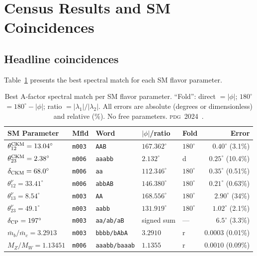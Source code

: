 \documentclass[preprint,12pt,number]{elsarticle}
\newcommand{\mfld}[1]{\texttt{#1}}
\newcommand{\word}[1]{\texttt{#1}}
\newcommand{\degr}{^{\circ}}
\newcommand{\PDG}{\textsc{pdg}}
\begin{document}
\section{Census Results and SM Coincidences}
\label{sec:results}

\subsection{Headline coincidences}
\label{sec:headline}

Table~\ref{tab:headline} presents the best spectral match for each SM flavor
parameter.

\begin{table}[htbp]
\centering
\caption{Best A-factor spectral match per SM flavor parameter.
  ``Fold'': direct $=|\phi|$; $180\degr$$=180\degr-|\phi|$; ratio $=|\lambda_1|/|\lambda_2|$.
  All errors are absolute (degrees or dimensionless) and relative (\%).
  No free parameters. \PDG\ 2024~\cite{PDG2024}.}
\label{tab:headline}
\small
\begin{tabular}{@{}lllp{1.5cm}lr@{}}
\toprule
SM Parameter & Mfld & Word & $|\phi|$/ratio & Fold & Error \\
\midrule
$\theta_{12}^{\rm CKM}=13.04\degr$ & \mfld{m003} & \word{AAB} & $167.362\degr$ & $180\degr$ & $0.40\degr$ (3.1\%) \\
$\theta_{23}^{\rm CKM}=2.38\degr$ & \mfld{m006} & \word{aaabb} & $2.132\degr$ & d & $0.25\degr$ (10.4\%) \\
$\delta_{\rm CKM}=68.0\degr$ & \mfld{m006} & \word{aa} & $112.346\degr$ & $180\degr$ & $0.35\degr$ (0.51\%) \\
$\theta_{12}^\nu=33.41\degr$ & \mfld{m006} & \word{abbAB} & $146.380\degr$ & $180\degr$ & $0.21\degr$ (0.63\%) \\
$\theta_{13}^\nu=8.54\degr$ & \mfld{m003} & \word{AA} & $168.556\degr$ & $180\degr$ & $2.90\degr$ (34\%) \\
$\theta_{23}^\nu=49.1\degr$ & \mfld{m003} & \word{aabb} & $131.919\degr$ & $180\degr$ & $1.02\degr$ (2.1\%) \\
$\delta_{\rm CP}=197\degr$ & \mfld{m003} & \word{aa/ab/aB} & signed sum & --- & $6.5\degr$ (3.3\%) \\
$\bar{m}_b/\bar{m}_c=3.2913$ & \mfld{m003} & \word{bbbb/bAbA} & $3.2910$ & r & $0.0003$ (0.01\%) \\
$M_Z/M_W=1.13451$ & \mfld{m006} & \word{aaabb/baaab} & $1.1355$ & r & $0.0010$ (0.09\%) \\
\bottomrule
\end{tabular}
\end{table}
\end{document}

